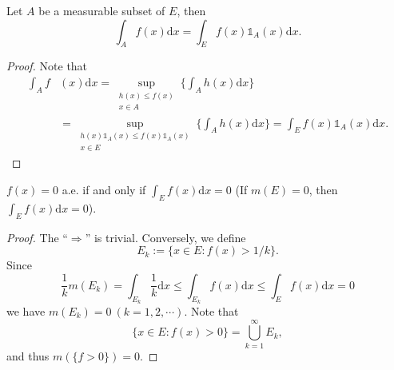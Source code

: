 \documentclass[11pt,singlecolumn, openany, citestyle=authoryear]{elegantbook}
\begin{document}
\begin{CJK}{UTF8}{gbsn}
\begin{proposition}
    Let $A$ be a measurable subset of $E$, then 
    $$
    \int_A f(x)\mathrm{d}x = \int_E f(x)\mathds{1}_A(x)\mathrm{d}x.
    $$
\end{proposition}
\begin{proof}
    Note that 
    \begin{align*}
        \int_A f&(x)\mathrm{d}x =\sup_{\substack{h(x)\leqslant f(x)\\x\in A}}
        \bigg\{\int_A h(x)\mathrm{d}x\bigg\}\\
        &= \sup_{\substack{h(x)\mathds{1}_{A}(x)\leqslant f(x)\mathds{1}_{A}(x)\\x\in E}}
        \bigg\{\int_A h(x)\mathrm{d}x\bigg\}=\int_E f(x)\mathds{1}_A(x)\mathrm{d}x.
    \end{align*}
\end{proof}

\begin{proposition}
    $f(x)=0$ a.e. if and only if $\displaystyle \int_E f(x)\mathrm{d}x=0$ (If $m(E)=0$,
    then $\displaystyle \int_E f(x)\mathrm{d}x=0$).
\end{proposition}
\begin{proof}
    The ``$\Longrightarrow$'' is trivial. Conversely, we define 
    $$
    E_k := \{x\in E: f(x)>1/k\}.
    $$
    Since 
    $$
    \frac{1}{k}m(E_k)=\int_{E_k}\frac{1}{k}\mathrm{d}x\leqslant \int_{E_k}f(x)\mathrm{d}x
    \leqslant \int_Ef(x)\mathrm{d}x=0
    $$
    we have $m(E_k)=0\ (k=1,2,\cdots)$. Note that 
    $$
    \{x\in E:f(x)>0\}=\bigcup_{k=1}^\infty E_k,
    $$
    and thus $m(\{f>0\})=0$.
\end{proof}


\end{CJK}
\end{document}
